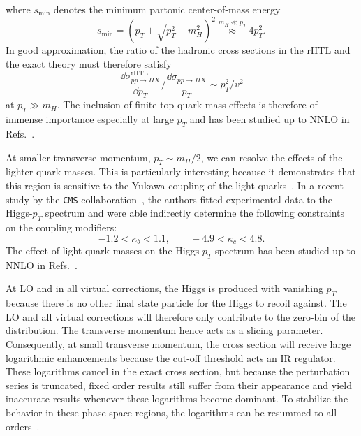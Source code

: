 where $s_\text{min}$ denotes the minimum partonic center-of-mass energy
\begin{equation}
s_\text{min} = \left(p_T + \sqrt{p_T^2 + m_H^2} \right)^2 \stackrel{m_H \ll p_T}{\approx} 4 p_T^2.
\label{eq:4:smin}
\end{equation}
In good approximation, the ratio of the hadronic cross sections in the \acs{rHTL} and the exact theory must therefore satisfy
\begin{equation}
\frac{\dd \sigma_{pp \rightarrow HX}^{\mathrm{rHTL}}}{\dd p_T} \bigg / \frac{\dd \sigma_{pp \rightarrow HX}}{ p_T} \sim p_T^2/v^2
\label{eq:4:dSig_rHTL/dSig}
\end{equation}
at $p_T \gg m_H$. The inclusion of finite top-quark mass effects is therefore of immense importance especially at large $p_T$ and has been studied up to \acs{NNLO} in Refs.~\cite{Grazzini:2013mca, Buschmann:2014sia, Jones:2018hbb}.

At smaller transverse momentum, $p_T \sim m_H/2$, we can resolve the effects of the lighter quark masses. This is particularly interesting because it demonstrates that this region is sensitive to the Yukawa coupling of the light quarks~\cite{Bishara:2016jga, Bonner:2016sdg}. In a recent study by the \texttt{CMS} collaboration~\cite{CMS:2018gwt}, the authors fitted experimental data to the Higgs-$p_T$ spectrum and were able indirectly determine the following constraints on the coupling modifiers:
\begin{equation}
-1.2 < \kappa_b < 1.1, \qquad -4.9 < \kappa_c < 4.8.
\end{equation}
The effect of light-quark masses on the Higgs-$p_T$ spectrum has been studied up to \acs{NNLO} in Refs.~\cite{Lindert:2017pky, Caola:2018zye, Bonciani:2022jmb,Czakon:2024ywb}.

At \acs{LO} and in all virtual corrections, the Higgs is produced with vanishing $p_T$ because there is no other final state particle for the Higgs to recoil against. The \acs{LO} and all virtual corrections will therefore only contribute to the zero-bin of the distribution. The transverse momentum hence acts as a slicing parameter. Consequently, at small transverse momentum, the cross section will receive large logarithmic enhancements because the cut-off threshold acts an \acs{IR} regulator. These logarithms cancel in the exact cross section, but because the perturbation series is truncated, fixed order results still suffer from their appearance and yield inaccurate results whenever these logarithms become dominant. To stabilize the behavior in these phase-space regions, the logarithms can be resummed to all orders~\cite{Mantler:2012bj,Grazzini:2013mca, Hamilton:2015nsa, Bagnaschi:2015qta, Bagnaschi:2015bop, Frederix:2016cnl, Caola:2016upw, Niggetiedt:2024nmp}.


